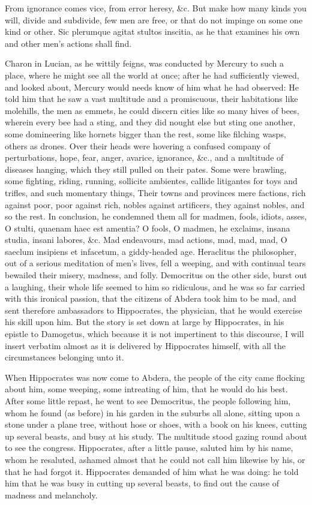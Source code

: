 {From ignorance comes vice, from error heresy, \&c. But make how many
kinds you will, divide and subdivide, few men are free, or that do not
impinge on some one kind or other. Sic plerumque agitat stultos
inscitia, as he that examines his own and other men's actions shall
find.

Charon in Lucian, as he wittily feigns, was conducted by Mercury
to such a place, where he might see all the world at once; after he had
sufficiently viewed, and looked about, Mercury would needs know of him
what he had observed: He told him that he saw a vast multitude and a
promiscuous, their habitations like molehills, the men as emmets, he
could discern cities like so many hives of bees, wherein every bee had
a sting, and they did nought else but sting one another, some
domineering like hornets bigger than the rest, some like filching
wasps, others as drones. Over their heads were hovering a confused
company of perturbations, hope, fear, anger, avarice, ignorance, \&c.,
and a multitude of diseases hanging, which they still pulled on their
pates. Some were brawling, some fighting, riding, running, sollicite
ambientes, callide litigantes for toys and trifles, and such momentary
things, Their towns and provinces mere factions, rich against poor,
poor against rich, nobles against artificers, they against nobles, and
so the rest. In conclusion, he condemned them all for madmen, fools,
idiots, asses, O stulti, quaenam haec est amentia? O fools, O madmen,
he exclaims, insana studia, insani labores, \&c. Mad endeavours, mad
actions, mad, mad, mad, O saeclum insipiens et infacetum, a
giddy-headed age. Heraclitus the philosopher, out of a serious
meditation of men's lives, fell a weeping, and with continual tears
bewailed their misery, madness, and folly. Democritus on the other
side, burst out a laughing, their whole life seemed to him so
ridiculous, and he was so far carried with this ironical passion, that
the citizens of Abdera took him to be mad, and sent therefore
ambassadors to Hippocrates, the physician, that he would exercise his
skill upon him. But the story is set down at large by Hippocrates, in
his epistle to Damogetus, which because it is not impertinent to this
discourse, I will insert verbatim almost as it is delivered by
Hippocrates himself, with all the circumstances belonging unto it.

When Hippocrates was now come to Abdera, the people of the city came
flocking about him, some weeping, some intreating of him, that he would
do his best. After some little repast, he went to see Democritus, the
people following him, whom he found (as before) in his garden in the
suburbs all alone, sitting upon a stone under a plane tree,
without hose or shoes, with a book on his knees, cutting up several
beasts, and busy at his study. The multitude stood gazing round about
to see the congress. Hippocrates, after a little pause, saluted him by
his name, whom he resaluted, ashamed almost that he could not call him
likewise by his, or that he had forgot it. Hippocrates demanded of him
what he was doing: he told him that he was busy in cutting up
several beasts, to find out the cause of madness and melancholy.

}
